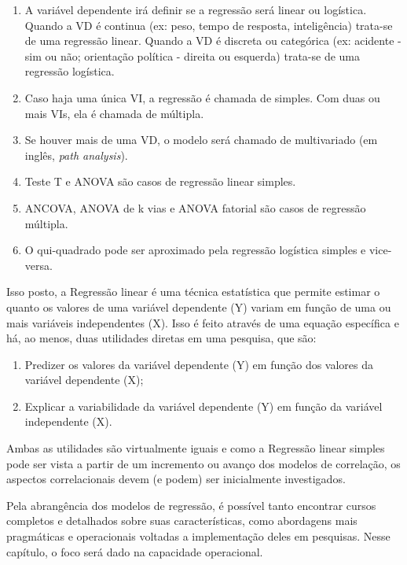 \documentclass[
]{book}
\providecommand{\tightlist}{%
  \setlength{\itemsep}{0pt}\setlength{\parskip}{0pt}}
\begin{document}
\begin{enumerate}
\def\labelenumi{\arabic{enumi}.}
\tightlist
\item
  A variável dependente irá definir se a regressão será linear ou logística. Quando a VD é continua (ex: peso, tempo de resposta, inteligência) trata-se de uma regressão linear. Quando a VD é discreta ou categórica (ex: acidente - sim ou não; orientação política - direita ou esquerda) trata-se de uma regressão logística.\\
\item
  Caso haja uma única VI, a regressão é chamada de simples. Com duas ou mais VIs, ela é chamada de múltipla.\\
\item
  Se houver mais de uma VD, o modelo será chamado de multivariado (em inglês, \emph{path analysis}).\\
\item
  Teste T e ANOVA são casos de regressão linear simples.\\
\item
  ANCOVA, ANOVA de k vias e ANOVA fatorial são casos de regressão múltipla.\\
\item
  O qui-quadrado pode ser aproximado pela regressão logística simples e vice-versa.
\end{enumerate}

Isso posto, a Regressão linear é uma técnica estatística que permite estimar o quanto os valores de uma variável dependente (Y) variam em função de uma ou mais variáveis independentes (X). Isso é feito através de uma equação específica e há, ao menos, duas utilidades diretas em uma pesquisa, que são:

\begin{enumerate}
\def\labelenumi{(\roman{enumi})}
\tightlist
\item
  Predizer os valores da variável dependente (Y) em função dos valores da variável dependente (X);\\
\item
  Explicar a variabilidade da variável dependente (Y) em função da variável independente (X).
\end{enumerate}

Ambas as utilidades são virtualmente iguais e como a Regressão linear simples pode ser vista a partir de um incremento ou avanço dos modelos de correlação, os aspectos correlacionais devem (e podem) ser inicialmente investigados.

Pela abrangência dos modelos de regressão, é possível tanto encontrar cursos completos e detalhados sobre suas características, como abordagens mais pragmáticas e operacionais voltadas a implementação deles em pesquisas. Nesse capítulo, o foco será dado na capacidade operacional.
\end{document}
